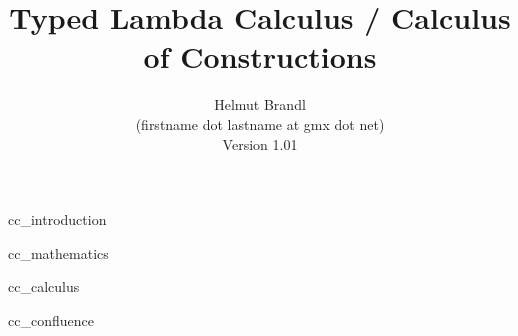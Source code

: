 \documentclass[12pt]{article}
\begin{document}


\title{
    Typed Lambda Calculus / Calculus of Constructions
}

\author{
    Helmut Brandl
    \\
    \scriptsize (firstname dot lastname at gmx dot net)
    \\
    \scriptsize Version 1.01
}
\date{}

\maketitle




\tableofcontents

 {cc_introduction}

 {cc_mathematics}

 {cc_calculus}

 {cc_confluence}






\end{document}
